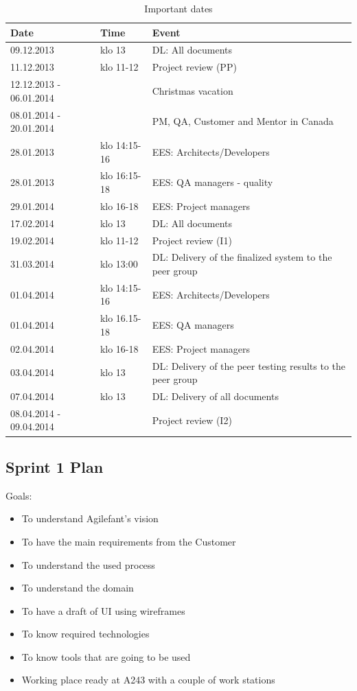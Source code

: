 \begin{table}[H]
\center
\begin{tabular}{|p{2cm}|p{3.8cm}|p{4.1cm}|} 
	
\hline 
\textbf{Date} & \textbf{Time} & \textbf{Event}\\ 
\hline
09.12.2013 & klo 13 &  DL: All documents \\
\hline
11.12.2013 & klo 11-12 & Project review (PP) \\
\hline
12.12.2013 - 06.01.2014 &  &  Christmas vacation \\
\hline
08.01.2014 - 20.01.2014 &  &  PM, QA, Customer and Mentor in Canada \\
\hline
28.01.2013 & klo 14:15-16 &  EES: Architects/Developers \\
\hline
28.01.2013 & klo 16:15-18 & EES: QA managers - quality \\
\hline
29.01.2014 & klo 16-18 &  EES: Project managers \\
\hline
17.02.2014 & klo 13 &  DL: All documents \\
\hline
19.02.2014 & klo 11-12 & Project review (I1) \\
\hline
31.03.2014 & klo 13:00 &  DL: Delivery of the finalized system to the peer
group\\
\hline
01.04.2014 & klo 14:15-16 & EES: Architects/Developers \\
\hline
01.04.2014 & klo 16.15-18 & EES: QA managers  \\
\hline
02.04.2014 & klo 16-18 &  EES: Project managers\\
\hline
03.04.2014 & klo 13 & DL: Delivery of the peer testing results to the peer group
\\
\hline
07.04.2014 & klo 13 & DL: Delivery of all documents \\
\hline
08.04.2014 - 09.04.2014 &  & Project review (I2) \\
\hline
\end{tabular} 
\caption{Important dates}
\label{table:dates}
\end{table}

\subsection{Sprint 1 Plan}

Goals:
\begin{itemize}
  \item To understand Agilefant's vision \checked
  \item To have the main requirements from the Customer \checked
  \item To understand the used process \checked
  \item To understand the domain \checked
  \item To have a draft of UI using wireframes \checked
  \item To know required technologies \checked
  \item To know tools that are going to be used \checked
  \item Working place ready at A243 with a couple of work stations \checked
\end{itemize}

